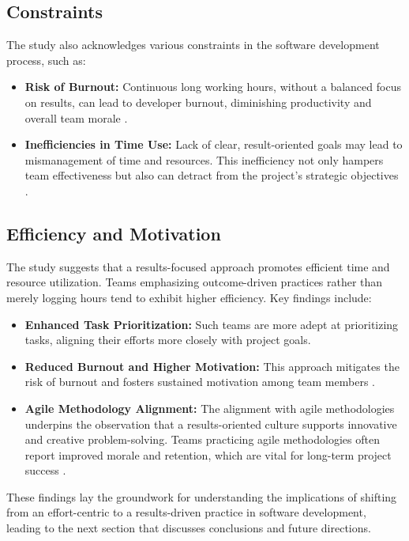 \documentclass{article}
\begin{document}
\subsection{Constraints}
The study also acknowledges various constraints in the software development process, such as:
\begin{itemize}
    \item \textbf{Risk of Burnout:} Continuous long working hours, without a balanced focus on results, can lead to developer burnout, diminishing productivity and overall team morale \cite{Dhas2015WorkLifeBalance}.
    \item \textbf{Inefficiencies in Time Use:} Lack of clear, result-oriented goals may lead to mismanagement of time and resources. This inefficiency not only hampers team effectiveness but also can detract from the project's strategic objectives \cite{FayadSchmidt1997, Lowe2019SoftwareMetrics}.
\end{itemize}

\subsection{Efficiency and Motivation}
The study suggests that a results-focused approach promotes efficient time and resource utilization. Teams emphasizing outcome-driven practices rather than merely logging hours tend to exhibit higher efficiency. Key findings include:
\begin{itemize}
    \item \textbf{Enhanced Task Prioritization:} Such teams are more adept at prioritizing tasks, aligning their efforts more closely with project goals.
    \item \textbf{Reduced Burnout and Higher Motivation:} This approach mitigates the risk of burnout and fosters sustained motivation among team members \cite{BudacuPocatilu2018}.
    \item \textbf{Agile Methodology Alignment:} The alignment with agile methodologies underpins the observation that a results-oriented culture supports innovative and creative problem-solving. Teams practicing agile methodologies often report improved morale and retention, which are vital for long-term project success \cite{Meckenstock2021ECIS, Saeed2019SoftwareDevelopment}.
\end{itemize}

These findings lay the groundwork for understanding the implications of shifting from an effort-centric to a results-driven practice in software development, leading to the next section that discusses conclusions and future directions.
\end{document}
